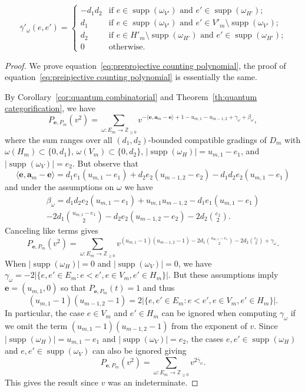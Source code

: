 \documentclass[ALCO,ThmDefs,Unicode,epreuves]{cedram}
\newcommand{\bfa}{\mathbf{a}}
\newcommand{\bfe}{\mathbf{e}}
\newcommand{\ZZ}{\mathbb{Z}}
\DeclareMathOperator{\supp}{supp}
\begin{document}
\begin{corollary}
\begin{itemize}
 \begin{equation*}
 \overline{\gamma}'_\omega(e,e')=\begin{cases}
 -d_1d_2 & \text{if $e\in\supp(\omega_{V'})$ and $e'\in\supp(\omega_{H'})$;}\\ 
 d_1 & \text{if $e\in\supp(\omega_{V'})$ and $e'\in V'_m\setminus\supp(\omega_{V'})$;}\\ 
 d_2 & \text{if $e\in H'_m\setminus\supp(\omega_{H'})$ and $e'\in\supp(\omega_{H'})$;}\\ 
 0 & \text{otherwise.}
 \end{cases}
 \end{equation*}
 \end{itemize}
\end{corollary}
\begin{proof}
 We prove equation~\eqref{eq:preprojective counting polynomial}, the proof of equation~\eqref{eq:preinjective counting polynomial} is essentially the same. 

 By Corollary~\ref{cor:quantum combinatorial} and Theorem~\ref{th:quantum categorification}, we have
 \[P_{\bfe,P_m}(v^2)=\sum\limits_{\omega:E_m\to\ZZ_{\ge0}} v^{-\langle\bfe,\bfa_m-\bfe\rangle+1-u_{m,1}-u_{m-1,2}+\gamma_\omega+\beta_\omega},\]
 where the sum ranges over all $(d_1,d_2)$-bounded compatible gradings of $D_m$ with $\omega(H_m)\subset\{0,d_1\}$, $\omega(V_m)\subset\{0,d_2\}$, $|\supp(\omega_H)|=u_{m,1}-e_1$, and $|\supp(\omega_V)|=e_2$.
 But observe that
 \[\langle\bfe,\bfa_m-\bfe\rangle=d_1e_1(u_{m,1}-e_1)+d_2e_2(u_{m-1,2}-e_2)-d_1d_2e_2(u_{m,1}-e_1)\]
 and under the assumptions on $\omega$ we have
 \begin{multline*}
 \beta_\omega=d_1d_2e_2(u_{m,1}-e_1)+u_{m,1}u_{m-1,2}-d_1e_1(u_{m,1}-e_1)
 \\
 -2d_1\binom{u_{m,1}-e_1}{2}-d_2e_2(u_{m-1,2}-e_2)-2d_2\binom{e_2}{2}.
 \end{multline*}
 Canceling like terms gives
 \[
 P_{\bfe,P_m}(v^2)=\sum\limits_{\omega:E_m\to\ZZ_{\ge0}} v^{(u_{m,1}-1)(u_{m-1,2}-1)-2d_1\binom{u_{m,1}-e_1}{2}-2d_2\binom{e_2}{2}+\gamma_\omega}.
 \]
 When $|\supp(\omega_H)|=0$ and $|\supp(\omega_V)|=0$, we have $\gamma_\omega=-2|\{e,e'\in E_m:e<e',e\in V_m, e'\in H_m\}|$.
 But these assumptions imply $\bfe=(u_{m,1},0)$ so that $P_{\bfe,P_m}(t)=1$ and thus 
 \[(u_{m,1}-1)(u_{m-1,2}-1)=2|\{e,e'\in E_m:e<e',e\in V_m, e'\in H_m\}|.\]
 In particular, the case $e\in V_m$ and $e'\in H_m$ can be ignored when computing $\gamma_\omega$ if we omit the term $(u_{m,1}-1)(u_{m-1,2}-1)$ from the exponent of $v$.
 Since $|\supp(\omega_H)|=u_{m,1}-e_1$ and $|\supp(\omega_V)|=e_2$, the cases $e,e'\in\supp(\omega_H)$ and $e,e'\in\supp(\omega_V)$ can also be ignored giving
 \[P_{\bfe,P_m}(v^2)=\sum\limits_{\omega:E_m\to\ZZ_{\ge0}} v^{2\overline{\gamma}_\omega}.\]
 This gives the result since $v$ was an indeterminate.
\end{proof}
\end{document}
